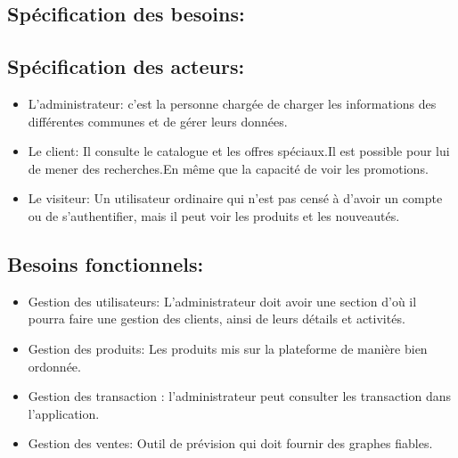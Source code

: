 \documentclass[a4paper]{report}
\begin{document}
\begin{doublespace}
	\section{Spécification des besoins:}
	
	\subsection{Spécification des acteurs:}
	\begin{itemize}
		\item L'administrateur: c'est la personne chargée
		      de charger les informations des différentes communes et de
		      gérer leurs données.
		\item  Le client: Il consulte le catalogue et les offres
		      spéciaux.Il est possible pour lui de mener des recherches.En même que la
		      capacité de voir les promotions.
		\item Le visiteur: Un utilisateur ordinaire qui n'est pas
		      censé à d'avoir un compte ou  de s'authentifier, mais il peut voir les produits
		      et les nouveautés.
	\end{itemize}
	\subsection{Besoins fonctionnels:}
	\begin{itemize}
		\item Gestion des utilisateurs: L'administrateur doit avoir
		      une section d'où il pourra faire une gestion des clients, ainsi de leurs
		      détails et activités.
		\item Gestion des produits: Les produits mis sur la
		      plateforme de manière bien ordonnée.
		\item Gestion des transaction : l’administrateur peut
		      consulter les transaction dans l'application.
		\item Gestion des ventes: Outil de prévision qui doit
		      fournir des graphes fiables.
	\end{itemize}

\end{doublespace}
\end{document}
